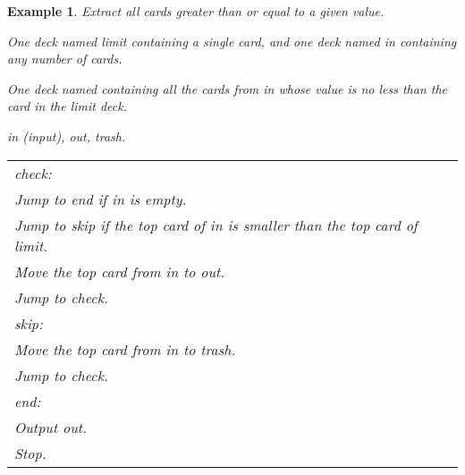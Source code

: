 \documentclass[a4paper,twoside]{tufte-handout}
\newtheorem{example}{Example}
\newcommand\lbl[1]{\hspace{-1em}\emph{#1:}}
\begin{document}
\begin{example}
  Extract all cards greater than or equal to a given value.
  \begin{description}
  \item[Input:] One deck named \emph{limit} containing a single card,
    and one deck named \emph{in} containing any number of cards.
  \item[Output:] One deck named containing all the cards
    from \emph{in} whose value is no less than the card in the
    \emph{limit} deck.
  \item[Decks:] \emph{in} (input), \emph{out}, \emph{trash}.

\clearpage

 \item[Algorithm:]
  \item\normalfont
    \begin{tabular}{l}
      \lbl{check}\\
      Jump to \emph{end} if \emph{in} is empty.\\
      Jump to \emph{skip} if the top card of \emph{in} is smaller than
      the top card of \emph{limit}.\\
      Move the top card from \emph{in} to \emph{out}.\\
      Jump to \emph{check}.\\
      \lbl{skip}\\
      Move the top card from \emph{in} to \emph{trash}.\\
      Jump to \emph{check}.\\
      \lbl{end}\\
      Output \emph{out}.\\
      Stop.
    \end{tabular}
  \end{description}
\end{example}
\end{document}
